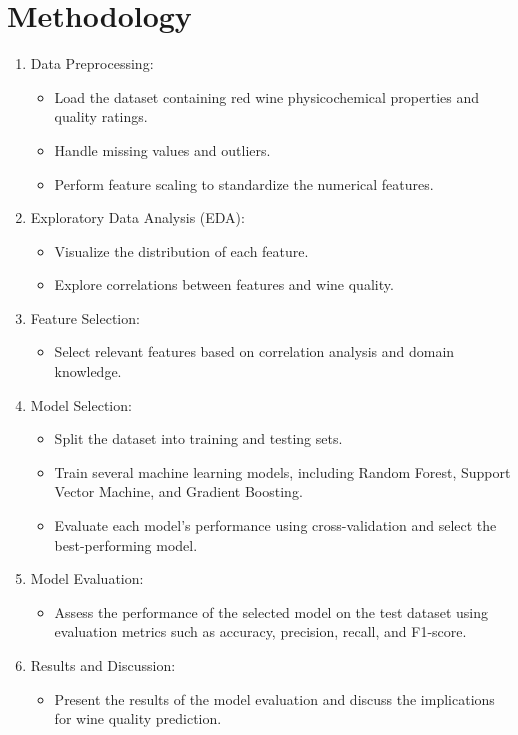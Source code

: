 \documentclass{article}
\begin{document}
\section{Methodology}
\begin{enumerate}
    \item Data Preprocessing:
    \begin{itemize}
        \item Load the dataset containing red wine physicochemical properties and quality ratings.
        \item Handle missing values and outliers.
        \item Perform feature scaling to standardize the numerical features.
    \end{itemize}
    
    \item Exploratory Data Analysis (EDA):
    \begin{itemize}
        \item Visualize the distribution of each feature.
        \item Explore correlations between features and wine quality.
    \end{itemize}
    
    \item Feature Selection:
    \begin{itemize}
        \item Select relevant features based on correlation analysis and domain knowledge.
    \end{itemize}
    
    \item Model Selection:
    \begin{itemize}
        \item Split the dataset into training and testing sets.
        \item Train several machine learning models, including Random Forest, Support Vector Machine, and Gradient Boosting.
        \item Evaluate each model's performance using cross-validation and select the best-performing model.
    \end{itemize}
    
    \item Model Evaluation:
    \begin{itemize}
        \item Assess the performance of the selected model on the test dataset using evaluation metrics such as accuracy, precision, recall, and F1-score.
    \end{itemize}
    
    \item Results and Discussion:
    \begin{itemize}
        \item Present the results of the model evaluation and discuss the implications for wine quality prediction.
    \end{itemize}

\end{enumerate}
\end{document}
